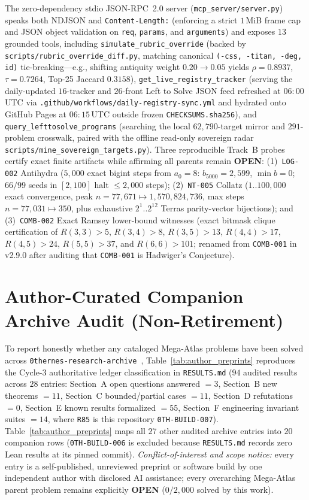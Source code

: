 \documentclass[11pt,reqno]{amsart}
\theoremstyle{plain}
\theoremstyle{definition}
\newcommand{\code}[1]{{\footnotesize\nolinkurl{#1}}}
\begin{document}
The zero-dependency stdio JSON-RPC~2.0 server (\code{mcp_server/server.py}) speaks both NDJSON and \code{Content-Length:} (enforcing a strict $1$\,MiB frame cap and JSON object validation on \code{req}, \code{params}, and \code{arguments}) and exposes $13$ grounded tools, including \code{simulate_rubric_override} (backed by \code{scripts/rubric_override_diff.py}, matching canonical \code{(-css, -titan, -deg, id)} tie-breaking---e.g., shifting antiquity weight $0.20\!\to\!0.05$ yields $\rho=0.8937$, $\tau=0.7264$, Top-25 Jaccard $0.3158$), \code{get_live_registry_tracker} (serving the daily-updated $16$-tracker and $26$-front Left to Solve JSON feed refreshed at $06{:}00$\,UTC via \code{.github/workflows/daily-registry-sync.yml} and hydrated onto GitHub Pages at $06{:}15$\,UTC outside frozen \code{CHECKSUMS.sha256}), and \code{query_lefttosolve_programs} (searching the local $62{,}790$-target mirror and $291$-problem crosswalk, paired with the offline read-only sovereign radar \code{scripts/mine_sovereign_targets.py}). Three reproducible Track~B probes certify exact finite artifacts while affirming all parents remain \textbf{OPEN}: (1)~\code{LOG-002} Antihydra ($5{,}000$ exact bigint steps from $a_0=8$: $b_{5000}=2{,}599$, $\min b=0$; $66/99$ seeds in $[2,100]$ halt $\le 2{,}000$ steps); (2)~\code{NT-005} Collatz ($1..100{,}000$ exact convergence, peak $n=77{,}671 \mapsto 1{,}570{,}824{,}736$, max steps $n=77{,}031 \mapsto 350$, plus exhaustive $2^1..2^{12}$ Terras parity-vector bijections); and (3)~\code{COMB-002} Exact Ramsey lower-bound witnesses (exact bitmask clique certification of $R(3,3)>5$, $R(3,4)>8$, $R(3,5)>13$, $R(4,4)>17$, $R(4,5)>24$, $R(5,5)>37$, and $R(6,6)>101$; renamed from \code{COMB-001} in v2.9.0 after auditing that \code{COMB-001} is Hadwiger's Conjecture).

\section{Author-Curated Companion Archive Audit (Non-Retirement)}
\label{sec:author_preprints}

To report honestly whether any cataloged Mega-Atlas problems have been solved across \code{0thernes-research-archive}~\cite{donahue2026archive}, Table~\ref{tab:author_preprints} reproduces the Cycle-3 authoritative ledger classification in \code{RESULTS.md} ($94$ audited results across $28$ entries: Section~A open questions answered $=3$, Section~B new theorems $=11$, Section~C bounded/partial cases $=11$, Section~D refutations $=0$, Section~E known results formalized $=55$, Section~F engineering invariant suites $=14$, where \code{R85} is this repository \code{0TH-BUILD-007}). Table~\ref{tab:author_preprints} maps all $27$ other audited archive entries into $20$ companion rows (\code{0TH-BUILD-006} is excluded because \code{RESULTS.md} records zero Lean results at its pinned commit). \emph{Conflict-of-interest and scope notice:} every entry is a self-published, unreviewed preprint or software build by one independent author with disclosed AI assistance; every overarching Mega-Atlas parent problem remains explicitly \textbf{OPEN} ($0 / 2{,}000$ solved by this work).
\end{document}
